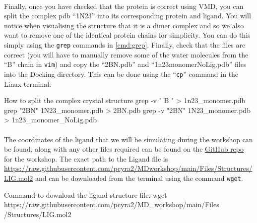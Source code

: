     \paragraph{}
        Finally, once you have checked that the protein is correct using VMD, you can split the complex pdb \enquote{1N23} into its corresponding protein and ligand. You will notice when visualising the structure that it is a dimer complex and so we also want to remove one of the identical protein chains for simplicity. You can do this simply using the \texttt{grep} commands in \cref{cmd:grep}.  Finally, check that the files are correct (you will have to manually remove some of the water molecules from the \enquote{B} chain in \texttt{vim}) and copy the \enquote{2BN.pdb} and \enquote{1n23\textunderscore monomer\textunderscore NoLig.pdb} files into the Docking directory. This can be done using the \enquote{\texttt{cp}} command in the Linux terminal. 

    \begin{bashcmd}[label=cmd:grep]{How to split the complex crystal structure}
    grep -v " B " > 1n23_monomer.pdb
    grep "2BN" 1N23_monomer.pdb > 2BN.pdb
    grep -v "2BN" 1N23_monomer.pdb > 1n23_monomer_NoLig.pdb        
    \end{bashcmd}

    \paragraph{}
        The coordinates of the ligand that we will be simulating during the workshop can be found, along with any other files required can be found on the \href{https://github.com/pcyra2/MD_workshop/tree/main/Files}{GitHub repo} for the workshop. The exact path to the Ligand file is \href{https://raw.githubusercontent.com/pcyra2/MD_workshop/main/Files/Structures/LIG.mol2}{https://raw.githubusercontent.com/pcyra2/MD\textunderscore workshop/main/Files/Structures/LIG.mol2} and can be downloaded from the terminal using the command \texttt{wget}.

    \begin{bashcmd}[label=cmd:wget]{Command to download the ligand structure file.}
        wget https://raw.githubusercontent.com/pcyra2/MD_workshop/main/Files /Structures/LIG.mol2
    \end{bashcmd}
    
